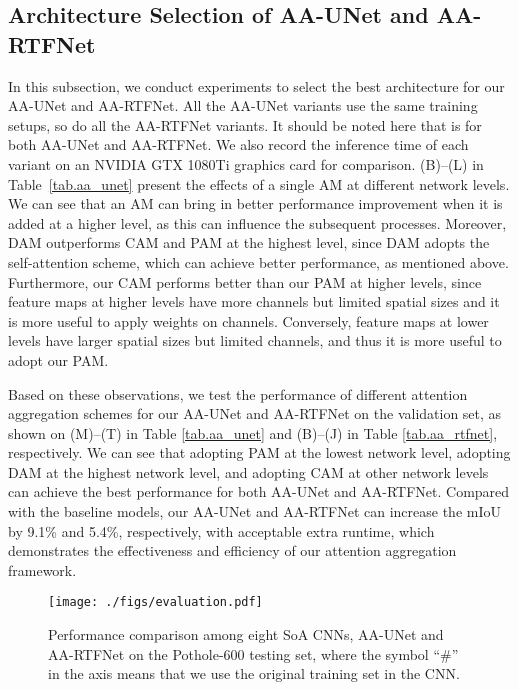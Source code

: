\documentclass[runningheads]{llncs}
\begin{document}
\subsection{Architecture Selection of AA-UNet and AA-RTFNet}
\label{sec.architecture_selection}
In this subsection, we conduct experiments to select the best architecture for our AA-UNet and AA-RTFNet. All the AA-UNet variants use the same training setups, so do all the AA-RTFNet variants. It should be noted here that  is for both AA-UNet and AA-RTFNet. We also record the inference time of each variant on an NVIDIA GTX 1080Ti graphics card for comparison. (B)--(L) in Table~\ref{tab.aa_unet} present the effects of a single AM at different network levels. We can see that an AM can bring in better performance improvement when it is added at a higher level, as this can influence the subsequent processes. Moreover, DAM outperforms CAM and PAM at the highest level, since DAM adopts the self-attention scheme, which can achieve better performance, as mentioned above. Furthermore, our CAM performs better than our PAM at higher levels, since feature maps at higher levels have more channels but limited spatial sizes and it is more useful to apply weights on channels. Conversely, feature maps at lower levels have larger spatial sizes but limited channels, and thus it is more useful to adopt our PAM.

Based on these observations, we test the performance of different attention aggregation schemes for our AA-UNet and AA-RTFNet on the validation set, as shown on (M)--(T) in Table \ref{tab.aa_unet} and (B)--(J) in Table \ref{tab.aa_rtfnet}, respectively. We can see that adopting PAM at the lowest network level, adopting DAM at the highest network level, and adopting CAM at other network levels can achieve the best performance for both AA-UNet and AA-RTFNet. Compared with the baseline models, our AA-UNet and AA-RTFNet can increase the mIoU by 9.1\% and 5.4\%, respectively, with acceptable extra runtime, which demonstrates the effectiveness and efficiency of our attention aggregation framework.

\begin{figure}[!htbp]
    \centering
    \texttt{[image: ./figs/evaluation.pdf]}
    \caption{Performance comparison among eight SoA CNNs, AA-UNet and AA-RTFNet on the Pothole-600 testing set, where the symbol ``\#'' in the  axis  means that we use the original training set in the CNN. }
    \label{fig.evaluation}
\end{figure}
\end{document}
